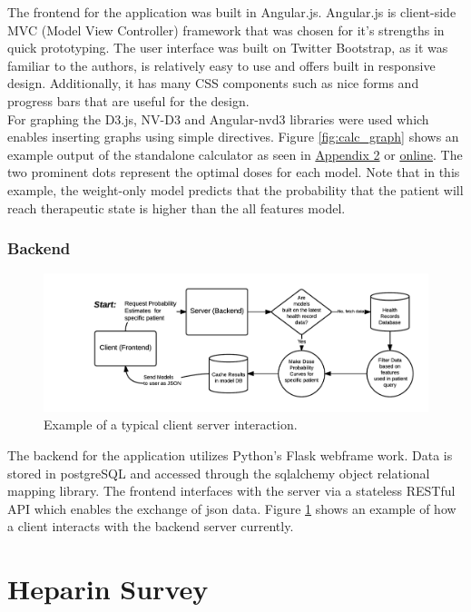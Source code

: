 \documentclass[12pt,a4paper,]{report}
\begin{document}
The frontend for the application was built in Angular.js. Angular.js is
client-side MVC (Model View Controller) framework that was chosen for
it's strengths in quick prototyping. The user interface was built on
Twitter Bootstrap, as it was familiar to the authors, is relatively easy
to use and offers built in responsive design. Additionally, it has many
CSS components such as nice forms and progress bars that are useful for
the design.\\
For graphing the D3.js, NV-D3 and Angular-nvd3 libraries were used which
enables inserting graphs using simple directives. Figure
\ref{fig:calc_graph} shows an example output of the standalone
calculator as seen in
\protect\hyperlink{appendix-2-application-user-interface}{Appendix 2} or
\href{https://hepstack-stage.herokuapp.com/\#/calc}{online}. The two
prominent dots represent the optimal doses for each model. Note that in
this example, the weight-only model predicts that the probability that
the patient will reach therapeutic state is higher than the all features
model.

\subsection{Backend}\label{backend}

\begin{figure}[H]
\noindent
\includegraphics[width=1.05\textwidth]{source/figures/arch1.png}
\caption{\label{fig:flow1}Example of a typical client server interaction.}
\end{figure}

The backend for the application utilizes Python's Flask webframe work.
Data is stored in postgreSQL and accessed through the sqlalchemy object
relational mapping library. The frontend interfaces with the server via
a stateless RESTful API which enables the exchange of json data. Figure
\ref{fig:flow1} shows an example of how a client interacts with the
backend server currently.

\chapter{Heparin Survey}\label{heparin-survey}
\end{document}
